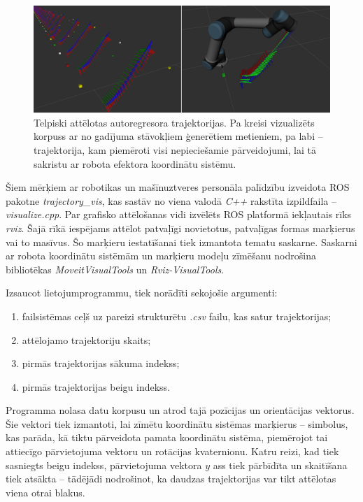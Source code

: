 \documentclass[12pt, a4paper]{article}
\numberwithin{equation}{section} %
\begin{document}
\begin{figure}[t!]
    \centering
    \includegraphics[width=16cm,page=1]{../img/trajectory_vis.png}
    \caption{Telpiski attēlotas autoregresora trajektorijas. Pa kreisi vizualizēts korpuss ar no gadījuma stāvokļiem ģenerētiem metieniem, pa labi -- trajektorija, kam piemēroti visi nepieciešamie pārveidojumi, lai tā sakristu ar robota efektora koordinātu sistēmu.}
\end{figure}

Šiem mērķiem ar robotikas un mašīnuztveres personāla palīdzību izveidota ROS pakotne \textit{trajectory\_vis}, kas sastāv no viena valodā \textit{C++} rakstīta izpildfaila -- \textit{visualize.cpp}. Par grafisko attēlošanas vidi izvēlēts ROS platformā iekļautais rīks \textit{rviz}. Šajā rīkā iespējams attēlot patvaļīgi novietotus, patvaļīgas formas marķierus vai to masīvus. Šo marķieru iestatīšanai tiek izmantota tematu saskarne. Saskarni ar robota koordinātu sistēmām un marķieru modeļu zīmēšanu nodrošina bibliotēkas \textit{MoveitVisualTools} un \textit{Rviz-VisualTools}. 

Izsaucot lietojumprogrammu, tiek norādīti sekojošie argumenti:

\begin{enumerate}
    \item failsistēmas ceļš uz pareizi strukturētu \textit{.csv} failu, kas satur trajektorijas;
    \item attēlojamo trajektoriju skaits;
    \item pirmās trajektorijas sākuma indekss;
    \item pirmās trajektorijas beigu indekss.
\end{enumerate}

Programma nolasa datu korpusu un atrod tajā pozīcijas un orientācijas vektorus. Šie vektori tiek izmantoti, lai zīmētu koordinātu sistēmas marķierus -- simbolus, kas parāda, kā tiktu pārveidota pamata koordinātu sistēma, piemērojot tai attiecīgo pārvietojuma vektoru un rotācijas kvaternionu. Katru reizi, kad tiek sasniegts beigu indekss, pārvietojuma vektora $y$ ass tiek pārbīdīta un skaitīšana tiek atsākta -- tādējādi nodrošinot, ka daudzas trajektorijas var tikt attēlotas viena otrai blakus. 
\end{document}
